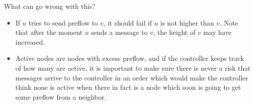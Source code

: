 \documentclass{forsete}
\begin{document}
What can go wrong with this?
\begin{itemize}
\item If $u$ tries to send preflow to $v$, it should fail if $u$ is not higher than $v$.
Note that after the moment $u$ sends a message to $v$, the height of $v$ may have increased.

\item Active nodes are nodes with excess preflow, and if the controller keeps track of how many are active,
it is important to make sure there is never a risk that messages arrive to the controller in an order which
would make the controller think none is active when there in fact is a node which soon is going to get some
preflow from a neighbor.

\end{itemize}
\end{document}
